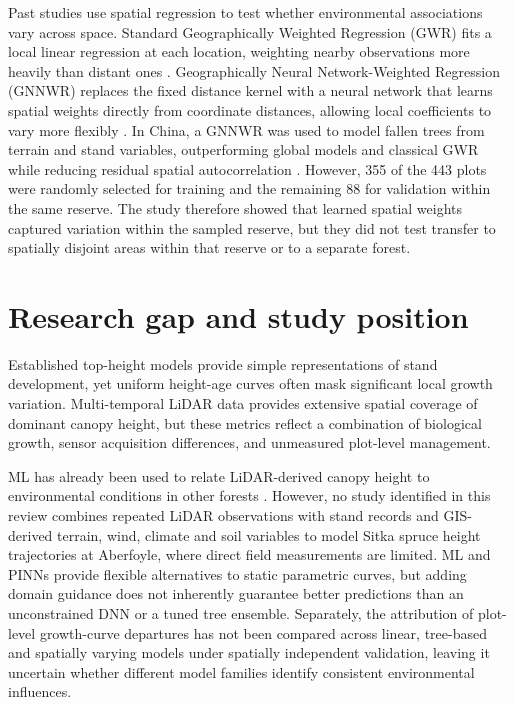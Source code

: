 \documentclass[logo,msc,ai]{infthesis}           %
\begin{document}
Past studies use spatial regression to test whether environmental associations vary across space. Standard Geographically Weighted Regression (GWR) fits a local linear regression at each location, weighting nearby observations more heavily than distant ones \cite{brunsdon1996Geographically_C6_GWR}. Geographically Neural Network-Weighted Regression (GNNWR) replaces the fixed distance kernel with a neural network that learns spatial weights directly from coordinate distances, allowing local coefficients to vary more flexibly \cite{du2020Geographically_C6_GWR}. In China, a GNNWR was used to model fallen trees from terrain and stand variables, outperforming global models and classical GWR while reducing residual spatial autocorrelation \cite{sun2022Local_C6_GWR}. However, 355 of the 443 plots were randomly selected for training and the remaining 88 for validation within the same reserve. The study therefore showed that learned spatial weights captured variation within the sampled reserve, but they did not test transfer to spatially disjoint areas within that reserve or to a separate forest.

\section{Research gap and study position}
\label{sec:background-gap}

Established top-height models provide simple representations of stand development, yet uniform height-age curves often mask significant local growth variation. Multi-temporal LiDAR data provides extensive spatial coverage of dominant canopy height, but these metrics reflect a combination of biological growth, sensor acquisition differences, and unmeasured plot-level management.

ML has already been used to relate LiDAR-derived canopy height to environmental conditions in other forests \cite{fricker2019More_C3_LID}. However, no study identified in this review combines repeated LiDAR observations with stand records and GIS-derived terrain, wind, climate and soil variables to model Sitka spruce height trajectories at Aberfoyle, where direct field measurements are limited. ML and PINNs provide flexible alternatives to static parametric curves, but adding domain guidance does not inherently guarantee better predictions than an unconstrained DNN or a tuned tree ensemble. Separately, the attribution of plot-level growth-curve departures has not been compared across linear, tree-based and spatially varying models under spatially independent validation, leaving it uncertain whether different model families identify consistent environmental influences.
\end{document}
